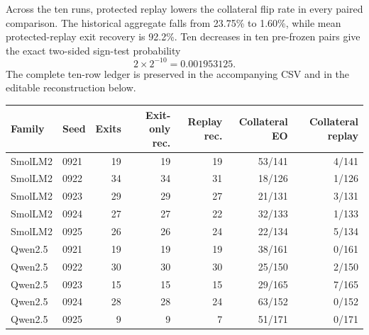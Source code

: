 \documentclass[11pt,letterpaper]{article}
\theoremstyle{plain}
\newcommand{\1}{\mathbf 1}
\begin{document}
Across the ten runs, protected replay lowers the collateral flip rate in every paired comparison. The historical aggregate falls from 23.75\% to 1.60\%, while mean protected-replay exit recovery is 92.2\%. Ten decreases in ten pre-frozen pairs give the exact two-sided sign-test probability
\begin{equation}
 2\times2^{-10}=0.001953125.
\end{equation}
The complete ten-row ledger is preserved in the accompanying CSV and in the editable reconstruction below.

\begin{center}\small
\begin{tabular}{llrrrrr}
\toprule
Family & Seed & Exits & Exit-only rec. & Replay rec. & Collateral EO & Collateral replay\\\midrule
SmolLM2 & 0921 & 19 & 19 & 19 & 53/141 & 4/141\\
SmolLM2 & 0922 & 34 & 34 & 31 & 18/126 & 1/126\\
SmolLM2 & 0923 & 29 & 29 & 27 & 21/131 & 3/131\\
SmolLM2 & 0924 & 27 & 27 & 22 & 32/133 & 1/133\\
SmolLM2 & 0925 & 26 & 26 & 24 & 22/134 & 5/134\\
Qwen2.5 & 0921 & 19 & 19 & 19 & 38/161 & 0/161\\
Qwen2.5 & 0922 & 30 & 30 & 30 & 25/150 & 2/150\\
Qwen2.5 & 0923 & 15 & 15 & 15 & 29/165 & 7/165\\
Qwen2.5 & 0924 & 28 & 28 & 24 & 63/152 & 0/152\\
Qwen2.5 & 0925 & 9 & 9 & 7 & 51/171 & 0/171\\
\bottomrule
\end{tabular}
\end{center}

\clearpage
\end{document}
